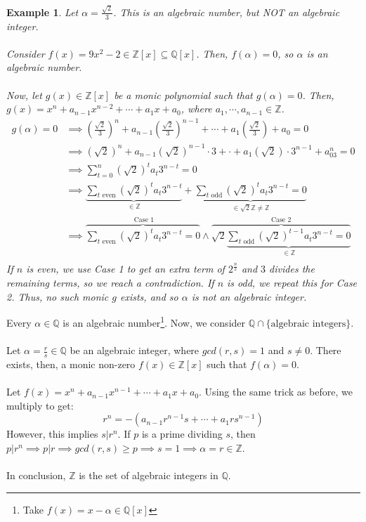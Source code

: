 \documentclass{article}
\newcommand{\Q}{\mathbb{Q}}
\newcommand{\Z}{\mathbb{Z}}
\newtheorem{example}{Example}
\begin{document}
\begin{example}
Let $\alpha=\frac{\sqrt{2}}{3}$. This is an algebraic number, but NOT an algebraic integer.\\
\\
Consider $f(x)=9x^2-2\in \Z[x]\subseteq \Q[x]$. Then, $f(\alpha)=0$, so $\alpha$ is an algebraic number.\\
\\
Now, let $g(x)\in \Z[x]$ be a monic polynomial such that $g(\alpha)=0$. Then, $g(x)=x^n+a_{n-1}x^{n-2}+\cdots +a_1x + a_0$, where $a_1,\cdots, a_{n-1}\in\Z$.
\begin{align*}
    g(\alpha)=0&\implies \left(\frac{\sqrt{2}}{3}\right)^n + a_{n-1}\left(\frac{\sqrt{2}}{3}\right)^{n-1}+\cdots + a_1\left(\frac{\sqrt{2}}{3}\right)+a_0=0\\
    &\implies (\sqrt{2})^n + a_{n-1}(\sqrt{2})^{n-1}\cdot 3+\cdot + a_1(\sqrt{2})\cdot 3^{n-1} + a_03^n = 0\\
    &\implies \displaystyle\sum_{t=0}^n (\sqrt{2})^ta_t3^{n-t}=0\\
    &\implies \underbrace{\displaystyle\sum_{t\text{ even}} (\sqrt{2})^ta_t3^{n-t}}_{\in\Z} + \underbrace{\displaystyle\sum_{t\text{ odd}} (\sqrt{2})^ta_t3^{n-t}=0}_{\in\sqrt{2}\Z\neq \Z}\\
    &\implies \overbrace{\displaystyle\sum_{t\text{ even}} (\sqrt{2})^ta_t3^{n-t}=0}^{\text{ Case 1}} \wedge \overbrace{\displaystyle \sqrt{2}\underbrace{\sum_{t\text{ odd}} (\sqrt{2})^{t-1}a_t3^{n-t}=0}_{\in\Z}}^{\text{Case 2}}\\
\end{align*}
If $n$ is even, we use Case 1 to get an extra term of $2^{\frac{n}{2}}$ and $3$ divides the remaining terms, so we reach a contradiction. If $n$ is odd, we repeat this for Case 2. Thus, no such monic $g$ exists, and so $\alpha$ is not an algebraic integer.
\end{example}
\noindent Every $\alpha\in\Q$ is an algebraic number\footnote{Take $f(x)=x-\alpha\in\Q[x]$}. Now, we consider $\Q\cap \{\text{algebraic integers}\}$.\\
\\
Let $\alpha=\frac{r}{s}\in\Q$ be an algebraic integer, where $gcd(r,s)=1$ and $s\neq 0$. There exists, then, a monic non-zero $f(x)\in\Z[x]$ such that $f(\alpha)=0$.\\
\\
Let $f(x)=x^n+a_{n-1}x^{n-1}+\cdots +a_1x+a_0$. Using the same trick as before, we multiply to get:
$$r^n=-(a_{n-1}r^{n-1}s+\cdots +a_1rs^{n-1})$$
However, this implies $s|r^n$. If $p$ is a prime dividing $s$, then $p|r^n\implies p|r\implies gcd(r,s)\geq p\implies s=1\implies \alpha=r\in\Z$.\\
\\
In conclusion, $\Z$ is the set of algebraic integers in $\Q$.
\end{document}
